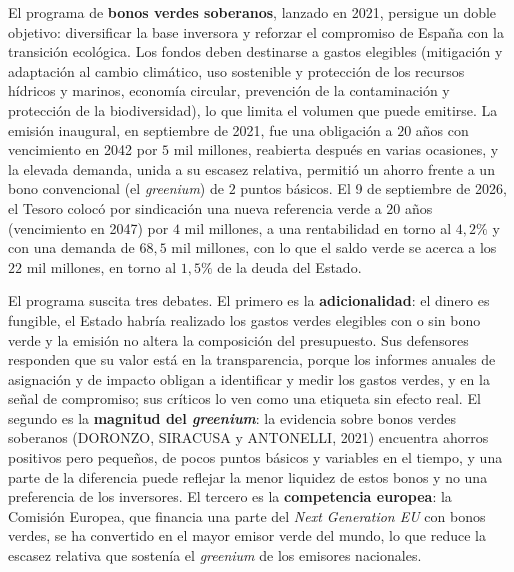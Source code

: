 \documentclass[10pt,a4paper]{article}
\begin{document}
El programa de \textbf{bonos verdes soberanos}, lanzado en 2021, persigue un doble objetivo: diversificar la base inversora y reforzar el compromiso de España con la transición ecológica. Los fondos deben destinarse a gastos elegibles (mitigación y adaptación al cambio climático, uso sostenible y protección de los recursos hídricos y marinos, economía circular, prevención de la contaminación y protección de la biodiversidad), lo que limita el volumen que puede emitirse. La emisión inaugural, en septiembre de 2021, fue una obligación a $20$ años con vencimiento en 2042 por $5$ mil millones, reabierta después en varias ocasiones, y la elevada demanda, unida a su escasez relativa, permitió un ahorro frente a un bono convencional (el \textit{greenium}) de $2$ puntos básicos. El 9 de septiembre de 2026, el Tesoro colocó por sindicación una nueva referencia verde a $20$ años (vencimiento en 2047) por $4$ mil millones, a una rentabilidad en torno al $4,2\%$ y con una demanda de $68,5$ mil millones, con lo que el saldo verde se acerca a los $22$ mil millones, en torno al $1,5\%$ de la deuda del Estado.

El programa suscita tres debates. El primero es la \textbf{adicionalidad}: el dinero es fungible, el Estado habría realizado los gastos verdes elegibles con o sin bono verde y la emisión no altera la composición del presupuesto. Sus defensores responden que su valor está en la transparencia, porque los informes anuales de asignación y de impacto obligan a identificar y medir los gastos verdes, y en la señal de compromiso; sus críticos lo ven como una etiqueta sin efecto real. El segundo es la \textbf{magnitud del \textit{greenium}}: la evidencia sobre bonos verdes soberanos (DORONZO, SIRACUSA y ANTONELLI, 2021) encuentra ahorros positivos pero pequeños, de pocos puntos básicos y variables en el tiempo, y una parte de la diferencia puede reflejar la menor liquidez de estos bonos y no una preferencia de los inversores. El tercero es la \textbf{competencia europea}: la Comisión Europea, que financia una parte del \textit{Next Generation EU} con bonos verdes, se ha convertido en el mayor emisor verde del mundo, lo que reduce la escasez relativa que sostenía el \textit{greenium} de los emisores nacionales.
\end{document}

